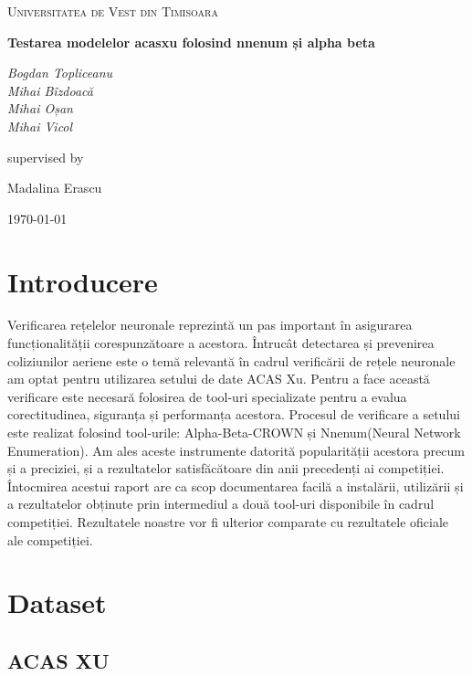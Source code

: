 \documentclass[12pt,a4paper]{article}
\begin{document}
\begin{titlepage}
	\centering
	{\LARGE \textsc{Universitatea de Vest din Timisoara}\par}
	\vspace{1cm}
	{\huge\bfseries Testarea modelelor acasxu folosind nnenum și alpha beta\par}
	\vspace{2cm}
	{\Large\itshape
					Bogdan Topliceanu \\
					Mihai Bîzdoacă\\
					Mihai Oșan \\
					Mihai Vicol\par}
	\vfill
	supervised by\par
	Madalina Erascu

	\vfill

	{\large \today\par}
\end{titlepage}

\section{Introducere}
Verificarea rețelelor neuronale reprezintă un pas important în asigurarea funcționalității corespunzătoare a acestora.
Întrucât detectarea și prevenirea coliziunilor aeriene este o temă relevantă în cadrul
verificării de rețele neuronale am optat pentru utilizarea setului de date ACAS Xu. Pentru a face
această verificare este necesară folosirea de tool-uri specializate pentru a evalua corectitudinea, siguranța și performanța acestora.
Procesul de verificare a setului este realizat folosind tool-urile: Alpha-Beta-CROWN și Nnenum(Neural Network Enumeration). Am ales aceste instrumente datorită popularității acestora
precum și a preciziei, și a rezultatelor satisfăcătoare din anii precedenți ai competiției.
Întocmirea acestui raport are ca scop documentarea facilă a instalării, utilizării și a rezultatelor obținute prin intermediul a două
tool-uri disponibile în cadrul competiției. Rezultatele noastre vor fi ulterior comparate cu rezultatele oficiale ale competiției.
\section{Dataset}

\subsection{ACAS XU}
\end{document}
